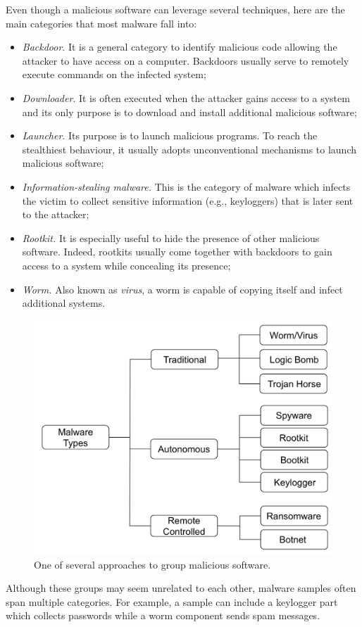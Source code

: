 \documentclass[LaM,binding=0.6cm]{sapthesis}
\begin{document}
Even though a malicious software can leverage several techniques, here are the main categories that most malware fall into:
\begin{itemize}
\item \textit{Backdoor}. It is a general category to identify malicious code allowing the attacker to have access on a computer. Backdoors usually serve to remotely execute commands on the infected system;
\item \textit{Downloader}. It is often executed when the attacker gains access to a system and its only purpose is to download and install additional malicious software;
\item \textit{Launcher}. Its purpose is to launch malicious programs. To reach the stealthiest behaviour, it usually adopts unconventional mechanisms to launch malicious software;
\item \textit{Information-stealing malware.} This is the category of malware which infects the victim to collect sensitive information (e.g., keyloggers) that is later sent to the attacker;
\item \textit{Rootkit.} It is especially useful to hide the presence of other malicious software. Indeed, rootkits usually come together with backdoors to gain access to a system while concealing its presence;
\item \textit{Worm.} Also known as \textit{virus}, a worm is capable of copying itself and infect additional systems.
\end{itemize}
\begin{figure}[h!]
\centering
\includegraphics[scale=.5]{images/background1}
\caption{One of several approaches to group malicious software.}
\end{figure}
Although these groups may seem unrelated to each other, malware samples often span multiple categories. For example, a sample can include a keylogger part which collects passwords while a worm component sends spam messages.
\end{document}
